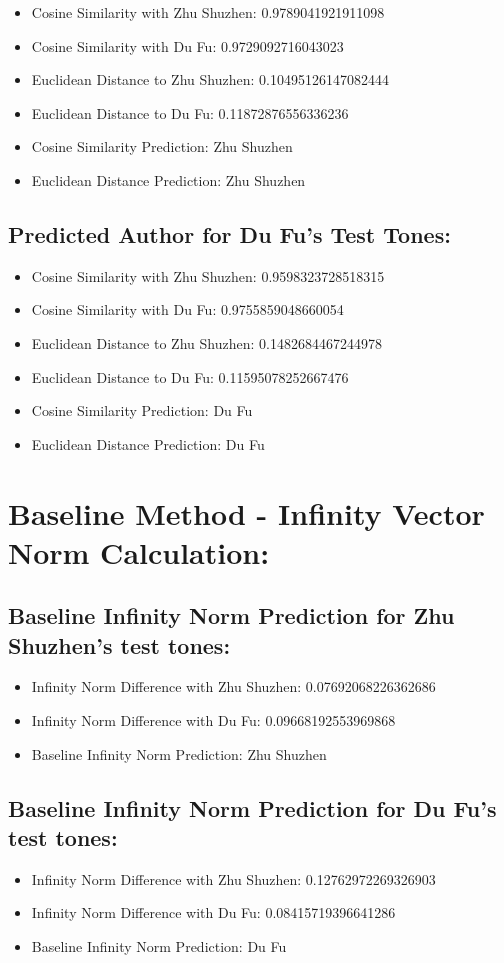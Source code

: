 \documentclass[12pt]{article}
\begin{document}
\begin{itemize}
    \item Cosine Similarity with Zhu Shuzhen: 0.9789041921911098
    \item Cosine Similarity with Du Fu: 0.9729092716043023
    \item Euclidean Distance to Zhu Shuzhen: 0.10495126147082444
    \item Euclidean Distance to Du Fu: 0.11872876556336236
    \item Cosine Similarity Prediction: Zhu Shuzhen
    \item Euclidean Distance Prediction: Zhu Shuzhen
\end{itemize}

\subsection*{Predicted Author for Du Fu's Test Tones:}

\begin{itemize}
    \item Cosine Similarity with Zhu Shuzhen: 0.9598323728518315
    \item Cosine Similarity with Du Fu: 0.9755859048660054
    \item Euclidean Distance to Zhu Shuzhen: 0.1482684467244978
    \item Euclidean Distance to Du Fu: 0.11595078252667476
    \item Cosine Similarity Prediction: Du Fu
    \item Euclidean Distance Prediction: Du Fu
\end{itemize}

\section*{Baseline Method - Infinity Vector Norm Calculation: }

\subsection*{Baseline Infinity Norm Prediction for Zhu Shuzhen's test tones:}

\begin{itemize}
    \item Infinity Norm Difference with Zhu Shuzhen: 0.07692068226362686
    \item Infinity Norm Difference with Du Fu: 0.09668192553969868
    \item Baseline Infinity Norm Prediction: Zhu Shuzhen
\end{itemize}

\subsection*{Baseline Infinity Norm Prediction for Du Fu's test tones:}


\begin{itemize}
    \item Infinity Norm Difference with Zhu Shuzhen: 0.12762972269326903
    \item Infinity Norm Difference with Du Fu: 0.08415719396641286
    \item Baseline Infinity Norm Prediction: Du Fu
\end{itemize}
\end{document}
